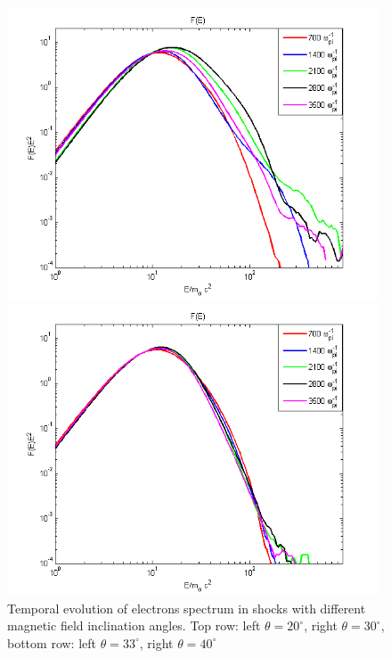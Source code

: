 \documentclass[a4paper]{jpconf}
\begin{document}
\begin{figure}[h!]
\begin{minipage}{0.49\textwidth}
			\includegraphics[width=0.98\textwidth]{fig/spectrum33.png} 
		\end{minipage}
		\begin{minipage}{0.49\textwidth}
			\centering
			\includegraphics[width=0.98\textwidth]{fig/spectrum40.png} 
		\end{minipage}
		\caption{Temporal evolution of electrons spectrum in shocks with different magnetic field inclination angles. Top row: left $\theta = 20^\circ$, right $\theta = 30^\circ$, bottom row: left $\theta = 33^\circ$, right $\theta = 40^\circ$}
		\label{spectrume}
	\end{figure}
\end{document}
